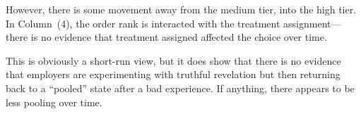 \documentclass[12pt]{article}
\begin{document}
However, there is some movement away from the medium tier, into the high tier.
In Column~(4), the order rank is interacted with the treatment assignment---there is no evidence that treatment assigned affected the choice over time.

 

This is obviously a short-run view, but it does show that there is no evidence that employers are experimenting with truthful revelation but then returning back to a ``pooled'' state after a bad experience.
If anything, there appears to be less pooling over time. 

\appendix
\newpage 
\end{document}
